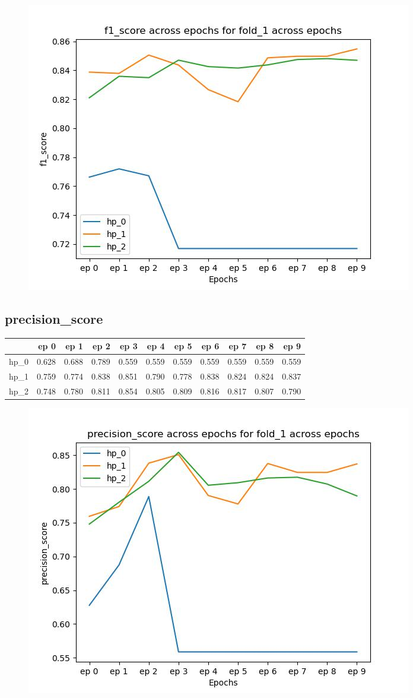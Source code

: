 \documentclass{article}
\begin{document}
\begin{figure}[H]
\includegraphics[scale = 0.75]{fold_1/f1_score}
\end{figure}
\subsection{precision\_score}
\begin{tabular}{lrrrrrrrrrr}
\toprule
{} &   ep 0 &   ep 1 &   ep 2 &   ep 3 &   ep 4 &   ep 5 &   ep 6 &   ep 7 &   ep 8 &   ep 9 \\
\midrule
hp\_0 &  0.628 &  0.688 &  0.789 &  0.559 &  0.559 &  0.559 &  0.559 &  0.559 &  0.559 &  0.559 \\
hp\_1 &  0.759 &  0.774 &  0.838 &  0.851 &  0.790 &  0.778 &  0.838 &  0.824 &  0.824 &  0.837 \\
hp\_2 &  0.748 &  0.780 &  0.811 &  0.854 &  0.805 &  0.809 &  0.816 &  0.817 &  0.807 &  0.790 \\
\bottomrule
\end{tabular}

\begin{figure}[H]
\includegraphics[scale = 0.75]{fold_1/precision_score}
\end{figure}
\end{document}
